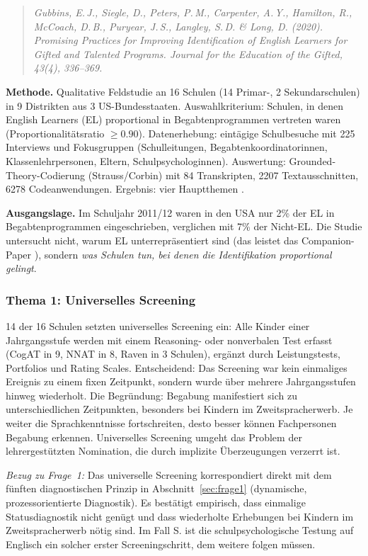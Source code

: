 \documentclass[ngerman, a4paper]{article}
\begin{document}
\begin{quote}\itshape
Gubbins, E.\,J., Siegle, D., Peters, P.\,M., Carpenter, A.\,Y.,
Hamilton, R., McCoach, D.\,B., Puryear, J.\,S., Langley, S.\,D.
\& Long, D. (2020). Promising Practices
for Improving Identification of English Learners for Gifted and Talented
Programs. \upshape Journal for the Education of the Gifted, 43(4),
336--369.
\end{quote}

\textbf{Methode.} Qualitative Feldstudie an 16 Schulen (14 Primar-, 2
Sekundarschulen) in 9 Distrikten aus 3 US-Bundesstaaten. Auswahlkriterium:
Schulen, in denen English Learners (EL) proportional in
Begabtenprogrammen vertreten waren (Proportionalitätsratio $\geq 0.90$).
Datenerhebung: eintägige Schulbesuche mit 225 Interviews und Fokusgruppen
(Schulleitungen, Begabtenkoordinatorinnen, Klassenlehrpersonen, Eltern,
Schulpsychologinnen). Auswertung: Grounded-Theory-Codierung
(Strauss/Corbin) mit 84 Transkripten, 2207 Textausschnitten, 6278
Codeanwendungen. Ergebnis: vier Hauptthemen
\parencite[S.\,9--13,\,23]{gubbins2020promising}.

\textbf{Ausgangslage.} Im Schuljahr 2011/12 waren in den USA nur 2\% der
EL in Begabtenprogrammen eingeschrieben, verglichen mit 7\% der Nicht-EL.
Die Studie untersucht nicht, warum EL unterrepräsentiert sind (das leistet
das Companion-Paper \textcite{mun2020identifying}), sondern
\textit{was Schulen tun, bei denen die Identifikation proportional
gelingt}.

\subsubsection*{Thema 1: Universelles Screening}

14 der 16 Schulen setzten universelles Screening ein: Alle Kinder einer
Jahrgangsstufe werden mit einem Reasoning- oder nonverbalen Test erfasst
(CogAT in 9, NNAT in 8, Raven in 3 Schulen), ergänzt durch
Leistungstests, Portfolios und Rating Scales. Entscheidend: Das Screening
war kein einmaliges Ereignis zu einem fixen Zeitpunkt, sondern wurde über
mehrere Jahrgangsstufen hinweg wiederholt. Die Begründung: Begabung
manifestiert sich zu unterschiedlichen Zeitpunkten, besonders bei Kindern
im Zweitspracherwerb. Je weiter die Sprachkenntnisse fortschreiten, desto
besser können Fachpersonen Begabung erkennen. Universelles Screening
umgeht das Problem der lehrergestützten Nomination, die durch implizite
Überzeugungen verzerrt ist.

\textit{Bezug zu Frage~1:} Das universelle Screening korrespondiert
direkt mit dem fünften diagnostischen Prinzip in
Abschnitt~\ref{sec:frage1} (dynamische, prozessorientierte Diagnostik).
Es bestätigt empirisch, dass einmalige Statusdiagnostik nicht genügt
\parencite{lemas2023begriffsklaerung} und dass wiederholte Erhebungen bei
Kindern im Zweitspracherwerb nötig sind. Im Fall S. ist die
schulpsychologische Testung auf Englisch ein solcher erster
Screeningschritt, dem weitere folgen müssen.
\end{document}
